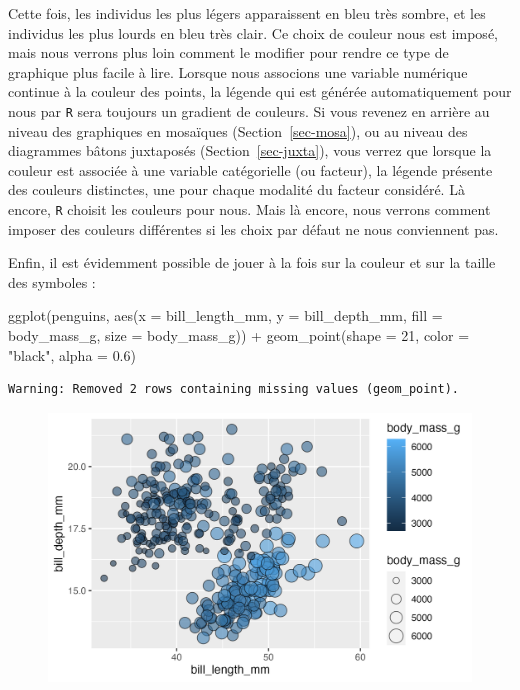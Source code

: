 \documentclass[
  letterpaper,
  DIV=11,
  numbers=noendperiod]{scrreprt}
\newenvironment{Shaded}{\begin{snugshade}}{\end{snugshade}}
\newcommand{\AttributeTok}[1]{\textcolor[rgb]{0.40,0.45,0.13}{#1}}
\newcommand{\DecValTok}[1]{\textcolor[rgb]{0.68,0.00,0.00}{#1}}
\newcommand{\FloatTok}[1]{\textcolor[rgb]{0.68,0.00,0.00}{#1}}
\newcommand{\FunctionTok}[1]{\textcolor[rgb]{0.28,0.35,0.67}{#1}}
\newcommand{\NormalTok}[1]{\textcolor[rgb]{0.00,0.23,0.31}{#1}}
\newcommand{\SpecialCharTok}[1]{\textcolor[rgb]{0.37,0.37,0.37}{#1}}
\newcommand{\StringTok}[1]{\textcolor[rgb]{0.13,0.47,0.30}{#1}}
\begin{document}
Cette fois, les individus les plus légers apparaissent en bleu très
sombre, et les individus les plus lourds en bleu très clair. Ce choix de
couleur nous est imposé, mais nous verrons plus loin comment le modifier
pour rendre ce type de graphique plus facile à lire. Lorsque nous
associons une variable numérique continue à la couleur des points, la
légende qui est générée automatiquement pour nous par \texttt{R} sera
toujours un gradient de couleurs. Si vous revenez en arrière au niveau
des graphiques en mosaïques (Section~\ref{sec-mosa}), ou au niveau des
diagrammes bâtons juxtaposés (Section~\ref{sec-juxta}), vous verrez que
lorsque la couleur est associée à une variable catégorielle (ou
facteur), la légende présente des couleurs distinctes, une pour chaque
modalité du facteur considéré. Là encore, \texttt{R} choisit les
couleurs pour nous. Mais là encore, nous verrons comment imposer des
couleurs différentes si les choix par défaut ne nous conviennent pas.

Enfin, il est évidemment possible de jouer à la fois sur la couleur et
sur la taille des symboles :

\begin{Shaded}
\begin{Highlighting}[]
\FunctionTok{ggplot}\NormalTok{(penguins, }\FunctionTok{aes}\NormalTok{(}\AttributeTok{x =}\NormalTok{ bill\_length\_mm, }\AttributeTok{y =}\NormalTok{ bill\_depth\_mm,}
                     \AttributeTok{fill =}\NormalTok{ body\_mass\_g, }\AttributeTok{size =}\NormalTok{ body\_mass\_g)) }\SpecialCharTok{+}
  \FunctionTok{geom\_point}\NormalTok{(}\AttributeTok{shape =} \DecValTok{21}\NormalTok{, }\AttributeTok{color =} \StringTok{"black"}\NormalTok{, }\AttributeTok{alpha =} \FloatTok{0.6}\NormalTok{)}
\end{Highlighting}
\end{Shaded}

\begin{verbatim}
Warning: Removed 2 rows containing missing values (geom_point).
\end{verbatim}

\begin{figure}[H]

{\centering \includegraphics{./03-visualization_files/figure-pdf/unnamed-chunk-77-1.png}

}

\end{figure}
\end{document}
